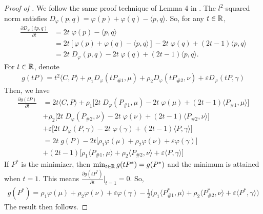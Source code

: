 \begin{proof}[Proof of ]
We follow the same proof technique of Lemma 4 in \citep{Khiem20}. The $l^2$-squared norm satisfies
$D_{\varphi}(p, q) = \varphi(p) + \varphi(q) - \langle p, q \rangle$. So, for any $t \in \mathbb R$,
\begin{align*}
  \frac{\partial D_{\varphi}(tp, q)}{\partial t}
  &= 2 t \; \varphi(p) - \langle p, q \rangle \\
  &= 2t \left[ \varphi(p) + \varphi(q) - \langle p, q \rangle \right]
  - 2t \; \varphi(q) + (2t-1) \langle p, q \rangle \\
  &= 2t \; D_{\varphi}(p, q) - 2t \; \varphi(q) + (2t - 1) \langle p, q \rangle.
\end{align*}
For $t \in \mathbb R$, denote
\begin{align*}
  g(tP) = t^2 \langle C, P \rangle + \rho_1 D_{\varphi}(t P_{\# 1}, \mu) +
  \rho_2 D_{\varphi}(t P_{\# 2}, \nu) + \varepsilon D_{\varphi}(t P, \gamma)
\end{align*}
Then, we have
\begin{align*}
  \frac{\partial g(tP)}{\partial t} &= 2t \langle C, P \rangle
  + \rho_1 \Big[ 2t \; D_{\varphi}(P_{\# 1}, \mu) - 2t \; \varphi(\mu)
  + (2t - 1) \langle P_{\# 1}, \mu \rangle \Big] \\
  &+ \rho_2 \Big[ 2t \; D_{\varphi}(P_{\# 2}, \nu) - 2t \; \varphi(\nu)
  + (2t - 1) \langle P_{\# 2}, \nu \rangle \Big] \\
  &+ \varepsilon \Big[ 2t \; D_{\varphi}(P, \gamma) - 2t \; \varphi(\gamma)
  + (2t - 1) \langle P, \gamma \rangle \Big] \\
  &= 2t \; g(P) - 2t \Big[ \rho_1 \varphi(\mu)
  + \rho_2 \varphi(\nu) + \varepsilon \varphi(\gamma) \Big] \\
  &+ (2t - 1) \Big[ \rho_1 \langle P_{\# 1}, \mu \rangle
  + \rho_2 \langle P_{\# 2}, \nu \rangle + \varepsilon \langle P, \gamma \rangle \Big]
\end{align*}
If $P^*$ is the minimizer, then $\min_{t \in \mathbb R} g(tP^*) = g(P^*)$ and the minimum is attained
when $t=1$. This means $\frac{\partial g(tP^*)}{\partial t} \Big |_{t = 1} = 0$. So,
\begin{align*}
  g(P^*) = \rho_1 \varphi(\mu)
  + \rho_2 \varphi(\nu) + \varepsilon \varphi(\gamma)
  - \frac{1}{2} \Big( \rho_1 \langle P^*_{\# 1}, \mu \rangle
  + \rho_2 \langle P^*_{\# 2}, \nu \rangle + \varepsilon \langle P^*, \gamma \rangle \Big)
\end{align*}
The result then follows.
\end{proof}

